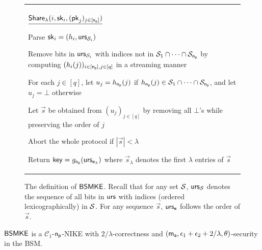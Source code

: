 \begin{figure}[htpb]
\begin{center}
{\begin{tabular}{l}
\begin{minipage}[t]{0.9\textwidth}
	$\underline{{\mathsf{Share}}_\lambda(i,\mathsf{sk}_i,(\mathsf{pk}_j)_{j\in[\mathsf{n_p}]})}$
	\item Parse $\mathsf{sk}_i=(h_i,\mathsf{urs}_{\mathcal{S}_i})$
	\item Remove bits in $\mathsf{urs}_{\mathcal{S}_i}$ with indices not in $\mathcal{S}_1\cap\cdots \cap\mathcal{S}_{\mathsf{n_p}}$ by computing $(h_i(j))_{i\in[\mathsf{n_p}],j\in[q]}$ in a streaming manner
	\item For each $j\in[q]$, let $u_j=h_{\mathsf{n_p}}(j)$ if $h_{\mathsf{n_p}}(j)\in\mathcal{S}_1\cap\cdots\cap\mathcal{S}_{\mathsf{n_p}}$, and let $u_j=\bot$ otherwise
	\item Let $\vec s$ be obtained from $(u_j)_{j\in[q]}$ by removing all $\bot$'s while preserving the order of $j$
	\item Abort the whole protocol if $|\vec s|< \lambda$
	\item Return $\mathsf{key}=g_{\mathsf{n_p}}(\mathsf{urs}_{\mathbf{s}_\lambda})$ where $\vec{s}_\lambda$ denotes the first $\lambda$ entries of $\vec s$
	
   \end{minipage}
	\end{tabular}}
\end{center}
\caption{The definition of ${\mathsf{BSMKE}}$. Recall that for any set $\mathcal{S}$, $\mathsf{urs}_{\mathcal{S}}$ denotes the sequence of all bits in $\mathsf{urs}$ with indices (ordered lexicographically) in $\mathcal{S}$. For any sequence $\vec s$, $\mathsf{urs}_{\mathbf{s}}$ follows the order of $\vec s$.}
\label{fig:con-bsmke}
\end{figure}
\begin{theorem}
\label{thm:bsmke}
${\mathsf{BSMKE}}$ is a $\mathcal C_1$-$\mathsf{n_p}$-NIKE with $2/\lambda$-correctness and $(\mathsf{m_a},\epsilon_1+\epsilon_2+2/\lambda,\theta)$-security in the BSM.
\end{theorem}

